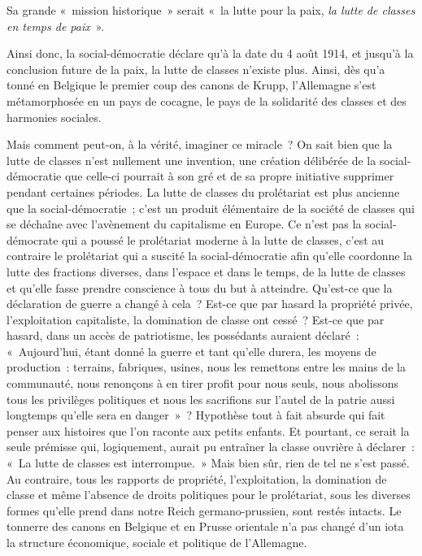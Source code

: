 \documentclass[french,twoside]{book} %
\begin{document}
\noindent Sa grande « mission historique » serait « la lutte pour la paix, \emph{la lutte de classes en temps de paix} ».\par
Ainsi donc, la social-démocratie déclare qu’à la date du 4 août 1914, et jusqu’à la conclusion future de la paix, la lutte de classes n’existe plus. Ainsi, dès qu’a tonné en Belgique le premier coup des canons de Krupp, l’Allemagne s’est métamorphosée en un pays de cocagne, le pays de la solidarité des classes et des harmonies sociales.\par
Mais comment peut-on, à la vérité, imaginer ce miracle ? On sait bien que la lutte de classes n’est nullement une invention, une création délibérée de la social-démocratie que celle-ci pourrait à son gré et de sa propre initiative supprimer pendant certaines périodes. La lutte de classes du prolétariat est plus ancienne que la social-démocratie ; c’est un produit élémentaire de la société de classes qui se déchaîne avec l’avènement du capitalisme en Europe. Ce n’est pas la social-démocrate qui a poussé le prolétariat moderne à la lutte de classes, c’est au contraire le prolétariat qui a suscité la social-démocratie afin qu’elle coordonne la lutte des fractions diverses, dans l’espace et dans le temps, de la lutte de classes et qu’elle fasse prendre conscience à tous du but à atteindre. Qu'est-ce que la déclaration de guerre a changé à cela ? Est-ce que par hasard la propriété privée, l’exploitation capitaliste, la domination de classe ont cessé ? Est-ce que par hasard, dans un accès de patriotisme, les possédants auraient déclaré : « Aujourd’hui, étant donné la guerre et tant qu’elle durera, les moyens de production : terrains, fabriques, usines, nous les remettons entre les mains de la communauté, nous renonçons à en tirer profit pour nous seuls, nous abolissons tous les privilèges politiques et nous les sacrifions sur l’autel de la patrie aussi longtemps qu’elle sera en danger » ? Hypothèse tout à fait absurde qui fait penser aux histoires que l’on raconte aux petits enfants. Et pourtant, ce serait la seule prémisse qui, logiquement, aurait pu entraîner la classe ouvrière à déclarer : « La lutte de classes est interrompue. » Mais bien sûr, rien de tel ne s’est passé. Au contraire, tous les rapports de propriété, l’exploitation, la domination de classe et même l’absence de droits politiques pour le prolétariat, sous les diverses formes qu’elle prend dans notre Reich germano-prussien, sont restés intacts. Le tonnerre des canons en Belgique et en Prusse orientale n’a pas changé d’un iota la structure économique, sociale et politique de l’Allemagne.\par
\end{document}
